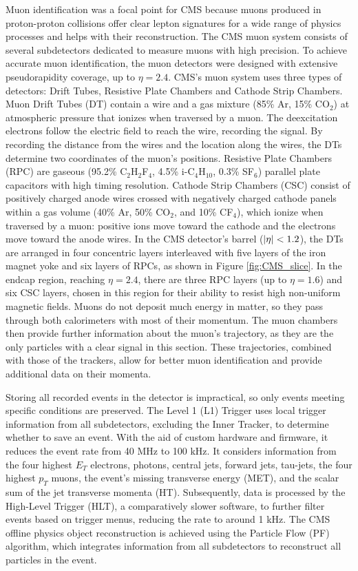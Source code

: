 Muon identification was a focal point for CMS because muons produced in proton-proton collisions offer clear lepton signatures for a wide range of physics processes and helps with their reconstruction. The CMS muon system consists of several subdetectors dedicated to measure muons with high precision. To achieve accurate muon identification, the muon detectors were designed with extensive pseudorapidity coverage, up to $\eta = 2.4$. CMS's muon system uses three types of detectors: Drift Tubes, Resistive Plate Chambers and Cathode Strip Chambers. Muon Drift Tubes (DT) contain a wire and a gas mixture (85\% Ar, 15\% CO$_2$) at atmospheric pressure that ionizes when traversed by a muon. The deexcitation electrons follow the electric field to reach the wire, recording the signal. By recording the distance from the wires and the location along the wires, the DTs determine two coordinates of the muon's positions. Resistive Plate Chambers (RPC) are gaseous (95.2\% C$_2$H$_2$F$_4$, 4.5\% i-C$_4$H$_{10}$, 0.3\% SF$_6$) parallel plate capacitors with high timing resolution. Cathode Strip Chambers (CSC) consist of positively charged anode wires crossed with negatively charged cathode panels within a gas volume (40\% Ar, 50\% CO$_2$, and 10\% CF$_4$), which ionize when traversed by a muon: positive ions move toward the cathode and the electrons move toward the anode wires. In the CMS detector's barrel ($\left\lvert\eta\right\rvert < 1.2$), the DTs are arranged in four concentric layers interleaved with five layers of the iron magnet yoke and six layers of RPCs, as shown in Figure \ref{fig:CMS_slice}. In the endcap region, reaching $\eta = 2.4$, there are three RPC layers (up to $\eta = 1.6$) and six CSC layers, chosen in this region for their ability to resist high non-uniform magnetic fields. Muons do not deposit much energy in matter, so they pass through both calorimeters with most of their momentum. The muon chambers then provide further information about the muon's trajectory, as they are the only particles with a clear signal in this section. These trajectories, combined with those of the trackers, allow for better muon identification and provide additional data on their momenta.

Storing all recorded events in the detector is impractical, so only events meeting specific conditions are preserved. The Level 1 (L1) Trigger uses local trigger information from all subdetectors, excluding the Inner Tracker, to determine whether to save an event. With the aid of custom hardware and firmware, it reduces the event rate from 40 MHz to 100 kHz. It considers information from the four highest $E_T$ electrons, photons, central jets, forward jets, tau-jets, the four highest $p_T$ muons, the event's missing transverse energy (MET), and the scalar sum of the jet transverse momenta (HT). Subsequently, data is processed by the High-Level Trigger (HLT), a comparatively slower software, to further filter events based on trigger menus, reducing the rate to around 1 kHz. The CMS offline physics object reconstruction is achieved using the Particle Flow (PF) algorithm, which integrates information from all subdetectors to reconstruct all particles in the event.

